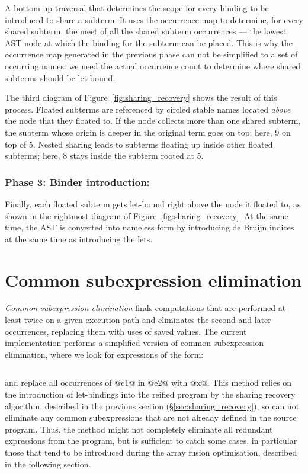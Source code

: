 A bottom-up traversal that determines the scope for every binding to be
introduced to share a subterm. It uses the occurrence map to determine, for
every shared subterm, the meet of all the shared subterm occurrences --- the
lowest AST node at which the binding for the subterm can be placed. This is why
the occurrence map generated in the previous phase can not be simplified to a
set of occurring names: we need the actual occurrence count to determine where
shared subterms should be let-bound.

The third diagram of Figure~\ref{fig:sharing_recovery} shows the result of this
process. Floated subterms are referenced by circled stable names located
\emph{above} the node that they floated to. If the node collects more than one
shared subterm, the subterm whose origin is deeper in the original term goes on
top; here, 9 on top of 5. Nested sharing leads to subterms floating up inside
other floated subterms; here, 8 stays inside the subterm rooted at 5.


\subsubsection*{Phase 3: Binder introduction:}

Finally, each floated subterm gets let-bound right above the node it floated to,
as shown in the rightmost diagram of Figure~\ref{fig:sharing_recovery}. At the
same time, the AST is converted into nameless  form by
introducing de Bruijn indices at the same time as introducing the lets.


\section{Common subexpression elimination}
\label{sec:cse}

\emph{Common subexpression elimination} finds computations that are performed at
least twice on a given execution path and eliminates the second and later
occurrences, replacing them with uses of saved values. The current
implementation performs a simplified version of common subexpression
elimination, where we look for expressions of the form:
%
\begin{lstlisting}[style=Haskell,numbers=none]
%\bf$\langle$ common subexpression elimination $\rangle$% let x = e1 in [x/e1]e2
\end{lstlisting}
%
and replace all occurrences of @e1@ in @e2@ with @x@. This method relies on the
introduction of let-bindings into the reified program by the sharing recovery
algorithm, described in the previous section (\S\ref{sec:sharing_recovery}), so
can not eliminate any common subexpressions that are not already defined in the
source program. Thus, the method might not completely eliminate all redundant
expressions from the program, but is sufficient to catch some cases, in
particular those that tend to be introduced during the array fusion
optimisation, described in the following section.

